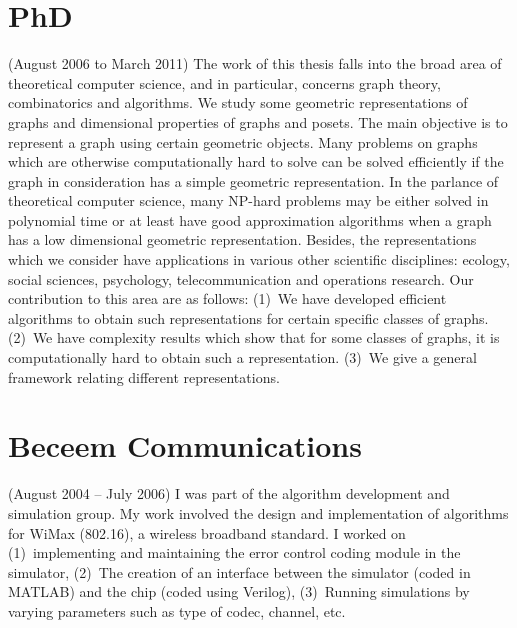 \documentclass[margin,10pt]{res} %
\begin{document}
\begin{resume}
{\section{\textnormal{PhD}}
(August 2006 to March 2011)
The work of this thesis falls into the broad area of theoretical computer
science, and in particular, concerns graph theory, combinatorics and
algorithms. We study some geometric representations of graphs and
dimensional properties of graphs and posets. The main objective is
to represent a graph using certain geometric objects. Many problems
on graphs which are otherwise computationally hard to solve can be
solved efficiently if the graph in consideration has a simple geometric
representation. In the parlance of theoretical computer science, many
NP-hard problems may be either solved in polynomial time or at least
have good approximation algorithms when a graph has a low dimensional
geometric representation. Besides, the representations which we consider
have applications in various other scientific disciplines: ecology,
social sciences, psychology, telecommunication and operations research.
Our contribution to this area are as follows:
(1)~We have developed efficient algorithms to
obtain such representations for certain specific classes of graphs.
(2)~We have complexity results which show that for some classes of graphs, it
is computationally hard to obtain such a representation.
(3)~We give a general framework relating different representations.
\section{\textnormal{Beceem Communications}}\label{sec:beceem}
(August 2004 -- July 2006)
I was part of the algorithm development and simulation group. My
work involved the design and implementation of algorithms for WiMax
(802.16), a wireless broadband standard. I worked on (1)~implementing
and maintaining the error control coding module in the simulator, 
(2)~The creation of an interface between
the simulator (coded in MATLAB) and the chip (coded using Verilog), 
(3)~Running simulations by
varying parameters such as type of codec, channel, etc.
}
\end{resume}
\end{document}
